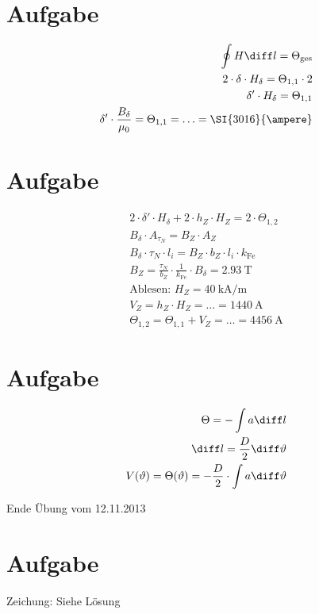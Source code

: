 \documentclass[10pt,a4paper]{article}
\begin{document}
\section{Aufgabe}
\begin{align*}
\oint H \diff l = \Theta_\text{ges}\\
2 \cdot \delta \cdot H_\delta = \Theta_{1,1} \cdot 2\\
\delta' \cdot H_\delta = \Theta_{1,1}\\
\delta' \cdot \frac{B_\delta}{\mu_0} = \Theta_{1,1} = \ldots = \SI{3016}{\ampere}
\end{align*}

\section{Aufgabe}
\begin{align*}
2\cdot \delta' \cdot H_\delta + 2 \cdot h_Z \cdot H_Z = 2 \cdot \Theta_{1,2}\\
B_\delta\cdot A_{\tau_N} = B_Z \cdot A_Z\\
B_\delta \cdot \tau_N \cdot l_i = B_Z \cdot b_Z \cdot l_i \cdot k_\text{Fe}\\
B_Z = \frac{\tau_N}{b_Z}\cdot \frac{1}{k_\text{Fe}}\cdot B_\delta = \SI{2.93}{\tesla}\\
\text{Ablesen: }H_Z = \SI{40}{\kilo\ampere\per\meter}\\
V_Z = h_Z \cdot H_Z = \ldots = \SI{1440}{\ampere}\\
\Theta_{1,2} = \Theta_{1,1} + V_Z = \ldots = \SI{4456}{\ampere}
\end{align*}

\section{Aufgabe}
\begin{align*}
\Theta = - \int a \diff l\\
\diff l = \frac{D}{2} \diff \vartheta\\
V(\vartheta) = \Theta(\vartheta) = - \frac{D}{2} \cdot \int a \diff \vartheta\\
\end{align*}

Ende Übung vom 12.11.2013

\section{Aufgabe}
Zeichung: Siehe Lösung\\
\end{document}
